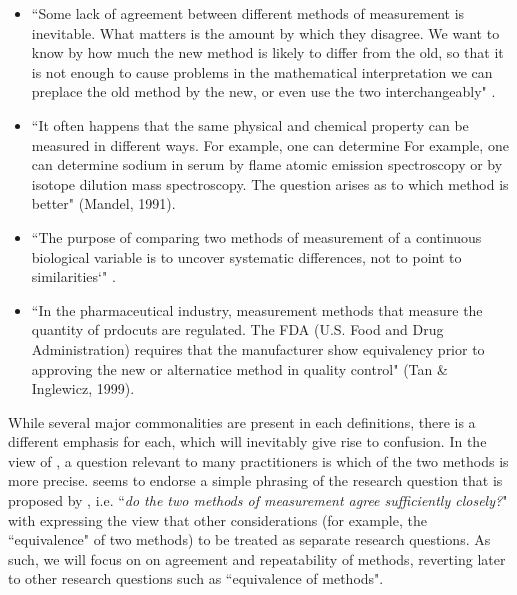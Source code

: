\documentclass[12pt, a4paper]{report}
\theoremstyle{plain}
\theoremstyle{definition}
\theoremstyle{remark}
\begin{document}
\begin{itemize}
		
\item	``Some lack of agreement between different methods of measurement is inevitable. What matters is the amount by which they disagree. We want to know by how much the new method is likely to differ from the old, so that it is not enough to cause problems in the mathematical interpretation we can preplace the old method by the new, or even use the two interchangeably" \citep{BA99}.
		
		
\item ``It often happens that the same physical and chemical property can be measured in different ways. For example, one can determine For example, one can determine sodium in serum by flame atomic emission spectroscopy or by isotope dilution mass spectroscopy. The question arises as to which method is better" (Mandel, 1991).
		
		
\item 	``The purpose of comparing two methods of measurement of a continuous biological variable is to uncover systematic differences, not to point to
		similarities`" \citep{ludbrook97}.
		
\item 	``In the pharmaceutical industry, measurement methods that measure the quantity of prdocuts are regulated. The FDA (U.S. Food and Drug Administration) requires that the manufacturer show equivalency prior to approving the new or alternatice method in quality control" (Tan \& Inglewicz, 1999). 
\end{itemize}
	
While several major commonalities are present in each definitions, there is a different emphasis for each, which will inevitably give rise to confusion. In the view of \citet{DunnSEME}, a question relevant to many practitioners is which of the two methods is more precise. \citet{BXC2010} seems to endorse a simple phrasing of the research question that is proposed by \citet{BA83}, i.e. ``\textit{do the two methods of measurement agree sufficiently closely?}" with \citet{BXC2010} expressing the view that other considerations (for example, the ``equivalence" of two methods) to be treated as separate research questions. As such, we will focus on on agreement and repeatability of methods, reverting later to other research questions such as ``equivalence of methods".
	
\end{document}
